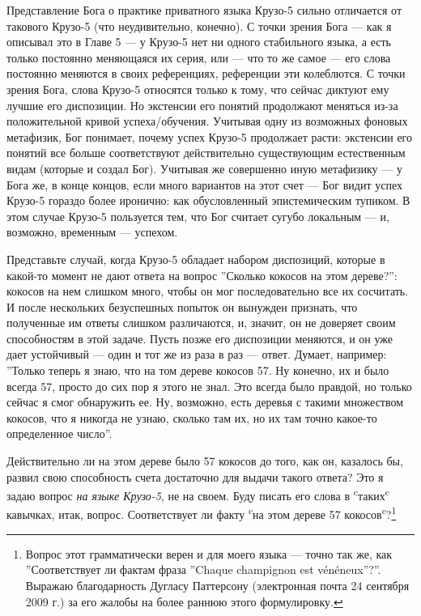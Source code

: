 \documentclass[11pt]{book}
\begin{document}
Представление Бога о практике приватного языка Крузо-5 сильно отличается от такового Крузо-5 (что неудивительно, конечно). С точки зрения Бога --- как я описывал это в Главе 5 --- у Крузо-5 нет ни одного стабильного языка, а есть только постоянно меняющаяся их серия, или --- что то же самое --- его слова постоянно меняются в своих референциях, референции эти колеблются. С точки зрения Бога, слова Крузо-5 относятся только к тому, что сейчас диктуют ему лучшие его диспозиции. Но экстенсии его понятий продолжают меняться из-за положительной кривой успеха/обучения. Учитывая одну из возможных фоновых метафизик, Бог понимает, почему успех Крузо-5 продолжает расти: экстенсии его понятий все больше соответствуют действительно существующим естественным видам (которые и создал Бог). Учитывая же совершенно иную метафизику --- у Бога же, в конце концов, если много вариантов на этот счет --- Бог видит успех Крузо-5 гораздо более иронично: как обусловленный эпистемическим тупиком. В этом случае Крузо-5 пользуется тем, что Бог считает сугубо локальным --- и, возможно, временным --- успехом.

Представьте случай, когда Крузо-5 обладает набором диспозиций, которые в какой-то момент не дают ответа на вопрос ''Сколько кокосов на этом дереве?'': кокосов на нем слишком много, чтобы он мог последовательно все их сосчитать. И после нескольких безуспешных попыток он вынужден признать, что полученные им ответы слишком различаются, и, значит, он не доверяет своим способностям в этой задаче. Пусть позже его диспозиции меняются, и он уже дает устойчивый --- один и тот же из раза в раз --- ответ. Думает, например: ''Только теперь я знаю, что на том дереве кокосов 57. Ну конечно, их и было всегда 57, просто до сих пор я этого не знал. Это всегда было правдой, но только сейчас я смог обнаружить ее. Ну, возможно, есть деревья с такими множеством кокосов, что я никогда не узнаю, сколько там их, но их там точно какое-то определенное число''.

Действительно ли на этом дереве было 57 кокосов до того, как он, казалось бы, развил свою способность счета достаточно для выдачи такого ответа? Это я задаю вопрос \textit{на языке Крузо-5}, не на своем. Буду писать его слова в \textsuperscript{c}таких\textsuperscript{c} кавычках, итак, вопрос. Соответствует ли факту \textsuperscript{c}на этом дереве 57 кокосов\textsuperscript{c}?\footnote{Вопрос этот грамматически верен и для моего языка --- точно так же, как ''Соответствует ли фактам фраза ''Chaque champignon est vénéneux''?''. Выражаю благодарность Дугласу Паттерсону (электронная почта 24 сентября 2009 г.) за его жалобы на более раннюю этого формулировку.}
\end{document}
